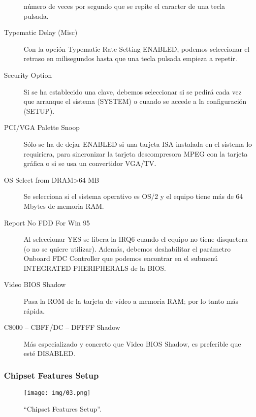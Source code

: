 \begin{description}
					número de veces por segundo que se repite el caracter de
					una tecla pulsada.
				\item[Typematic Delay (Misc)] Con la opción Typematic Rate
					Setting ENABLED, podemos seleccionar el retraso en
					milisegundos hasta que una tecla pulsada empieza a repetir.
				\item[Security Option] Si se ha establecido una clave, debemos
					seleccionar si se pedirá cada vez que arranque el sistema
					(SYSTEM) o cuando se accede a la configuración (SETUP).
				\item[PCI/VGA Palette Snoop] Sólo se ha de dejar ENABLED si una
					tarjeta ISA instalada en el sistema lo requiriera, para
					sincronizar la tarjeta descompresora MPEG con la tarjeta
					gráfica o si se usa un convertidor VGA/TV.
				\item[OS Select from DRAM>64 MB] Se selecciona si el sistema
					operativo es OS/2 y el equipo tiene más de 64 Mbytes de
					memoria RAM.
				\item[Report No FDD For Win 95] Al seleccionar YES se libera la
					IRQ6 cuando el equipo no tiene disquetera (o no se quiere
					utilizar). Además, debemos deshabilitar el parámetro
					Onboard FDC Controller que podemos encontrar en el submenú
					INTEGRATED PHERIPHERALS de la BIOS.
				\item[Video BIOS Shadow] Pasa la ROM de la tarjeta de vídeo a
					memoria RAM; por lo tanto más rápida.
				\item[C8000 – CBFF/DC – DFFFF Shadow] Más especializado y
					concreto que Video BIOS Shadow, es preferible que esté
					DISABLED.
			\end{description}

		\subsubsection{Chipset Features Setup}{\label{sub:chipset features setup}}
			\begin{figure}[H]
				\centering
					\texttt{[image: img/03.png]}
				\caption{``Chipset Features Setup''.}
			\end{figure}
			
